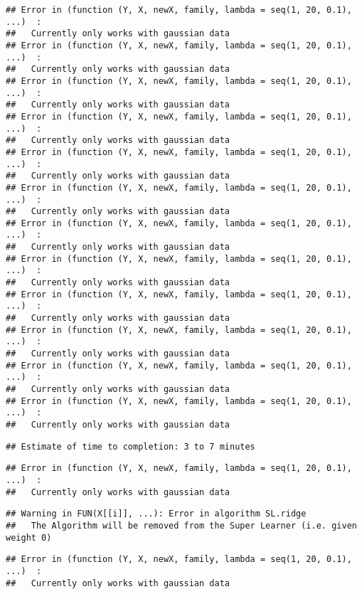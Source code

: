 \documentclass[
]{article}
\begin{document}
\begin{verbatim}
## Error in (function (Y, X, newX, family, lambda = seq(1, 20, 0.1), ...)  : 
##   Currently only works with gaussian data
## Error in (function (Y, X, newX, family, lambda = seq(1, 20, 0.1), ...)  : 
##   Currently only works with gaussian data
## Error in (function (Y, X, newX, family, lambda = seq(1, 20, 0.1), ...)  : 
##   Currently only works with gaussian data
## Error in (function (Y, X, newX, family, lambda = seq(1, 20, 0.1), ...)  : 
##   Currently only works with gaussian data
## Error in (function (Y, X, newX, family, lambda = seq(1, 20, 0.1), ...)  : 
##   Currently only works with gaussian data
## Error in (function (Y, X, newX, family, lambda = seq(1, 20, 0.1), ...)  : 
##   Currently only works with gaussian data
## Error in (function (Y, X, newX, family, lambda = seq(1, 20, 0.1), ...)  : 
##   Currently only works with gaussian data
## Error in (function (Y, X, newX, family, lambda = seq(1, 20, 0.1), ...)  : 
##   Currently only works with gaussian data
## Error in (function (Y, X, newX, family, lambda = seq(1, 20, 0.1), ...)  : 
##   Currently only works with gaussian data
## Error in (function (Y, X, newX, family, lambda = seq(1, 20, 0.1), ...)  : 
##   Currently only works with gaussian data
## Error in (function (Y, X, newX, family, lambda = seq(1, 20, 0.1), ...)  : 
##   Currently only works with gaussian data
## Error in (function (Y, X, newX, family, lambda = seq(1, 20, 0.1), ...)  : 
##   Currently only works with gaussian data
\end{verbatim}

\begin{verbatim}
## Estimate of time to completion: 3 to 7 minutes
\end{verbatim}

\begin{verbatim}
## Error in (function (Y, X, newX, family, lambda = seq(1, 20, 0.1), ...)  : 
##   Currently only works with gaussian data
\end{verbatim}

\begin{verbatim}
## Warning in FUN(X[[i]], ...): Error in algorithm SL.ridge 
##   The Algorithm will be removed from the Super Learner (i.e. given weight 0)
\end{verbatim}

\begin{verbatim}
## Error in (function (Y, X, newX, family, lambda = seq(1, 20, 0.1), ...)  : 
##   Currently only works with gaussian data
\end{verbatim}
\end{document}
